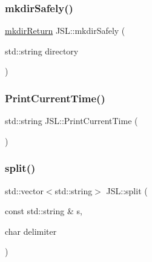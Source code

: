 \mbox{\label{namespaceJSL_a1db6f26ec58c53d1a56375c0f1b27c77}} 
\subsubsection{\texorpdfstring{mkdir\+Safely()}{mkdirSafely()}}
{\footnotesize\ttfamily \hyperlink{structJSL_1_1mkdirReturn}{mkdir\+Return} J\+S\+L\+::mkdir\+Safely (\begin{DoxyParamCaption}\item[{std\+::string}]{directory }\end{DoxyParamCaption})\hspace{0.3cm}{\ttfamily [inline]}}

\mbox{\label{namespaceJSL_a22fc26d87034a744e42e70e77db892df}} 
\subsubsection{\texorpdfstring{Print\+Current\+Time()}{PrintCurrentTime()}}
{\footnotesize\ttfamily std\+::string J\+S\+L\+::\+Print\+Current\+Time (\begin{DoxyParamCaption}{ }\end{DoxyParamCaption})\hspace{0.3cm}{\ttfamily [inline]}}

\mbox{\label{namespaceJSL_a34a7ba28084b304e97a707c653dce887}} 
\subsubsection{\texorpdfstring{split()}{split()}}
{\footnotesize\ttfamily std\+::vector$<$std\+::string$>$ J\+S\+L\+::split (\begin{DoxyParamCaption}\item[{const std\+::string \&}]{s,  }\item[{char}]{delimiter }\end{DoxyParamCaption})\hspace{0.3cm}{\ttfamily [inline]}}

